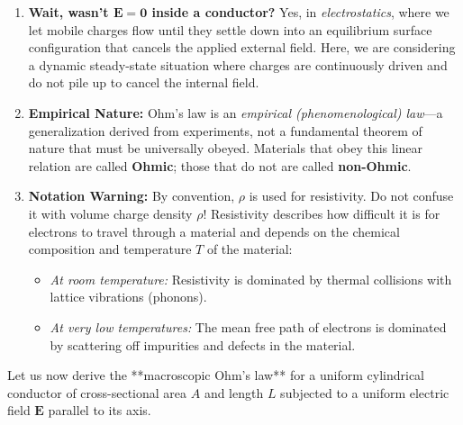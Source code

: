 \begin{remark}
\begin{enumerate}
    \item \textbf{Wait, wasn't $\bm{E} = \bm{0}$ inside a conductor?} Yes, in \emph{electrostatics}, where we let mobile charges flow until they settle down into an equilibrium surface configuration that cancels the applied external field. Here, we are considering a dynamic steady-state situation where charges are continuously driven and do not pile up to cancel the internal field.
    \item \textbf{Empirical Nature:} Ohm's law is an \emph{empirical (phenomenological) law}—a generalization derived from experiments, not a fundamental theorem of nature that must be universally obeyed. Materials that obey this linear relation are called \textbf{Ohmic}; those that do not are called \textbf{non-Ohmic}.
    \item \textbf{Notation Warning:} By convention, $\rho$ is used for resistivity. Do not confuse it with volume charge density $\rho$! Resistivity describes how difficult it is for electrons to travel through a material and depends on the chemical composition and temperature $T$ of the material:
    \begin{itemize}
        \item \emph{At room temperature:} Resistivity is dominated by thermal collisions with lattice vibrations (phonons).
        \item \emph{At very low temperatures:} The mean free path of electrons is dominated by scattering off impurities and defects in the material.
    \end{itemize}
\end{enumerate}
\end{remark}

Let us now derive the **macroscopic Ohm's law** for a uniform cylindrical conductor of cross-sectional area $A$ and length $L$ subjected to a uniform electric field $\bm{E}$ parallel to its axis.

